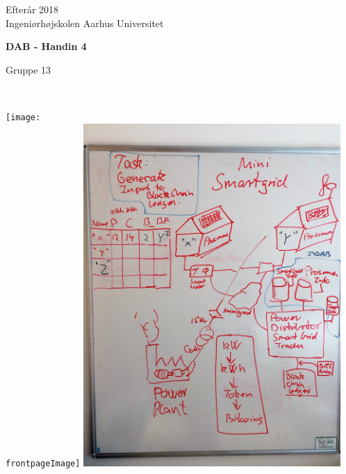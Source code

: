 \begin{center}
	{\fontsize{12pt}{0}\selectfont
		Efterår 2018\\
	}
		\vspace{5pt}
	{\fontsize{12pt}{0}\selectfont
		Ingeniørhøjskolen Aarhus Universitet\\
	}

	\vspace{25pt}
	
	{\fontsize{42pt}{0}\selectfont
		\textbf{DAB - Handin 4\\}
	}
	\vspace{5pt}
	
	{\fontsize{28pt}{0}\selectfont
		Gruppe 13\\
	}
	\vspace{25pt}
	

	{\fontsize{28pt}{0}\selectfont
        \textbf{\thetitle\\}
	}
	\vspace{20pt}

	\ifdefined\frontpageImage
		\texttt{[image: \\frontpageImage]}
	\else
		\includegraphics[width=\linewidth,height=370pt,keepaspectratio]{../../images/smartgrid.jpg}
	\fi
	\vspace*{\fill}


\end{center}
